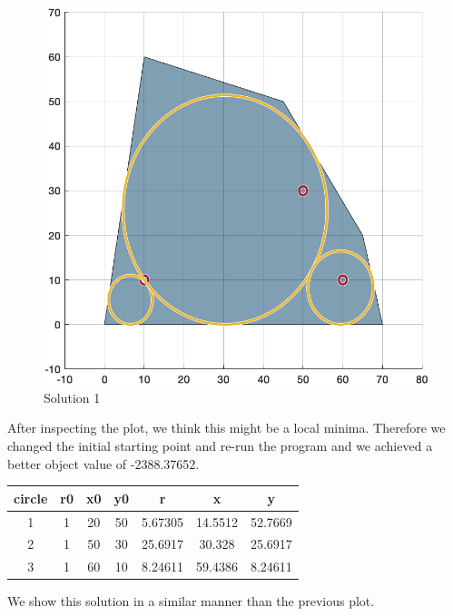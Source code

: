 \begin{figure}[h]
    \centering
    \includegraphics{hw2/prob1_plot1.png}
    \caption{Solution 1}
\end{figure}

After inspecting the plot, we think this might be a local minima. Therefore we changed the initial starting point and re-run the program and we achieved a better object value of -2388.37652.

\begin{center}
\begin{tabular}{c || c | c | c || c | c | c}
     circle & r0 & x0 & y0 & r & x & y \\
     \hline
     1     & 1  & 20 & 50 & 5.67305 & 14.5512 & 52.7669 \\
     2     & 1  & 50 & 30 & 25.6917 & 30.328 & 25.6917 \\
     3     & 1  & 60 & 10 & 8.24611 & 59.4386 & 8.24611 \\
\end{tabular}
\end{center}

We show this solution in a similar manner than the previous plot.

